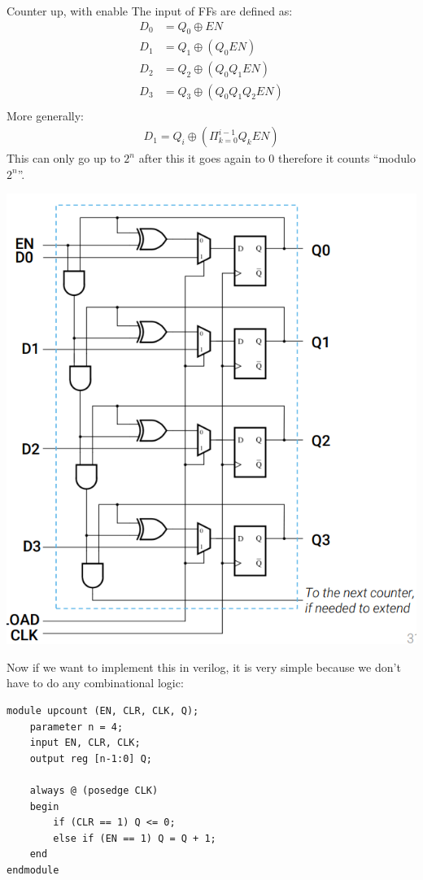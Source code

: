 \begin{parag}{Counter up, with enable}
    The input of FFs are defined as:
    \begin{align*} 
        D_0 &= Q_0 \oplus EN\\
        D_1 &= Q_1 \oplus \left(Q_0 EN\right)\\
        D_2 &= Q_2 \oplus \left(Q_0Q_1 EN\right)\\
        D_3 &= Q_3 \oplus \left(Q_0Q_1Q_2 EN\right)\\
    \end{align*}
    More generally:
    \begin{align*} D_1 =  Q_i \oplus \left(\Pi_{k = 0}^{i-1}Q_k EN\right) \end{align*}
    This can only go up to $2^n$ after this it goes again to $0$ therefore it counts ``modulo $2^n$''.
    
    \begin{center}
        \includegraphics[scale=0.5]{62025-06-20.png}
    \end{center}
    
    Now if we want to implement this in verilog, it is very simple because we don't have to do any combinational logic:
    \begin{lstlisting}
module upcount (EN, CLR, CLK, Q);
    parameter n = 4;
    input EN, CLR, CLK;
    output reg [n-1:0] Q;

    always @ (posedge CLK)
    begin
        if (CLR == 1) Q <= 0;
        else if (EN == 1) Q = Q + 1;
    end
endmodule
    \end{lstlisting}
    
\end{parag}








